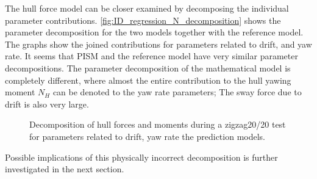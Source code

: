 \FloatBarrier
The hull force model can be closer examined by decomposing the individual parameter contributions. \autoref{fig:ID_regression_N_decomposition} shows the parameter decomposition for the two models together with the reference model. The graphs show the joined contributions for parameters related to drift, and yaw rate. It seems that PISM and the reference model have very similar parameter decompositions.
The parameter decomposition of the mathematical model is completely different, where almost the entire contribution to the hull yawing moment $N_H$ can be denoted to the yaw rate parameters; The sway force due to drift is also very large.  
\begin{figure}[h]
    \begin{center}
        
        \caption{Decomposition of hull forces and moments during a zigzag20/20 test for parameters related to drift, yaw rate the prediction models.}
        \label{fig:ID_regression_N_decomposition}
    \end{center}
\end{figure}
Possible implications of this physically incorrect decomposition is further investigated in the next section.